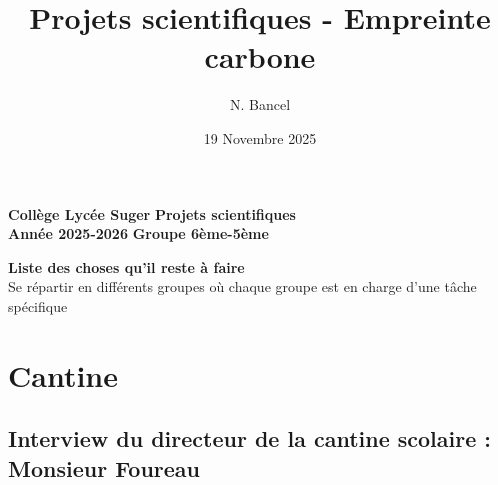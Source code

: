 \documentclass{exam}
\title{Projets scientifiques - Empreinte carbone}
\author{N. Bancel}
\date{19 Novembre 2025}
\begin{document}
\textbf{Collège Lycée Suger}
\hfill
\textbf{Projets scientifiques} \\

\textbf{Année 2025-2026}
\hfill
\textbf{Groupe 6ème-5ème} \par

{\let\newpage\relax\maketitle}

\begin{center}
  \textbf{Liste des choses qu'il reste à faire} \\
  Se répartir en différents groupes où chaque groupe est en charge d'une tâche spécifique
\end{center}

\section*{Cantine}

\subsection*{Interview du directeur de la cantine scolaire : Monsieur Foureau}
\end{document}
